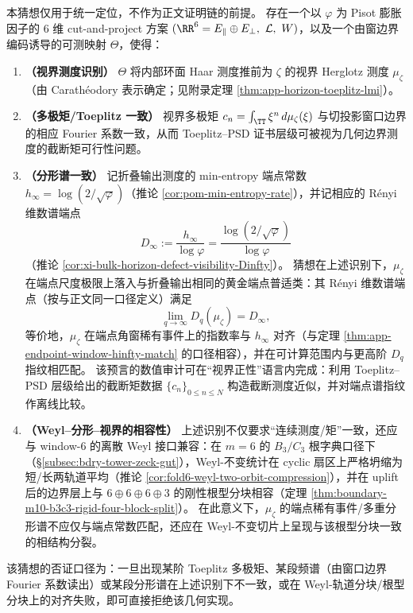\begin{conjecture}\label{conj:discussion-horizon-measure-cutproject}
本猜想仅用于统一定位，不作为正文证明链的前提。
存在一个以 \(\varphi\) 为 Pisot 膨胀因子的 \(6\) 维 cut-and-project 方案 \((\RR^6=E_{\parallel}\oplus E_{\perp},\ \mathcal{L},\ W)\)，以及一个由窗边界编码诱导的可测映射 \(\Theta\)，使得：
\begin{enumerate}
  \item \textbf{（视界测度识别）}
  \(\Theta\) 将内部环面 Haar 测度推前为 \(\zeta\) 的视界 Herglotz 测度 \(\mu_\zeta\)（由 Carath\'eodory 表示确定；见附录定理 \ref{thm:app-horizon-toeplitz-lmi}）。
  \item \textbf{（多极矩/Toeplitz 一致）}
  视界多极矩 \(c_n=\int_{\TT}\xi^n\,d\mu_\zeta(\xi)\) 与切投影窗口边界的相应 Fourier 系数一致，从而 Toeplitz--PSD 证书层级可被视为几何边界测度的截断矩可行性问题。
  \item \textbf{（分形谱一致）}
  记折叠输出测度的 min-entropy 端点常数 \(h_\infty=\log(2/\sqrt\varphi)\)（推论 \ref{cor:pom-min-entropy-rate}），并记相应的 Rényi 维数谱端点
  \[
    D_\infty:=\frac{h_\infty}{\log\varphi}=\frac{\log(2/\sqrt\varphi)}{\log\varphi}
  \]
  （推论 \ref{cor:xi-bulk-horizon-defect-visibility-Dinfty}）。
  猜想在上述识别下，\(\mu_\zeta\) 在端点尺度极限上落入与折叠输出相同的黄金端点普适类：其 Rényi 维数谱端点（按与正文同一口径定义）满足
  \[
    \lim_{q\to\infty}D_q(\mu_\zeta)=D_\infty,
  \]
  等价地，\(\mu_\zeta\) 在端点角窗稀有事件上的指数率与 \(h_\infty\) 对齐（与定理 \ref{thm:app-endpoint-window-hinfty-match} 的口径相容），并在可计算范围内与更高阶 \(D_q\) 指纹相匹配。
  该预言的数值审计可在“视界正性”语言内完成：利用 Toeplitz--PSD 层级给出的截断矩数据 \(\{c_n\}_{0\le n\le N}\) 构造截断测度近似，并对端点谱指纹作离线比较。
  \item \textbf{（Weyl--分形--视界的相容性）}
  上述识别不仅要求“连续测度/矩”一致，还应与 window-6 的离散 Weyl 接口兼容：在 \(m=6\) 的 \(B_3/C_3\) 根字典口径下（\S\ref{subsec:bdry-tower-zeck-gut}），Weyl-不变统计在 cyclic 扇区上严格坍缩为短/长两轨道平均（推论 \ref{cor:fold6-weyl-two-orbit-compression}），并在 uplift 后的边界层上与 \(6\oplus 6\oplus 6\oplus 3\) 的刚性根型分块相容（定理 \ref{thm:boundary-m10-b3c3-rigid-four-block-split}）。
  在此意义下，\(\mu_\zeta\) 的端点稀有事件/多重分形谱不应仅与端点常数匹配，还应在 Weyl-不变切片上呈现与该根型分块一致的相结构分裂。
\end{enumerate}
该猜想的否证口径为：一旦出现某阶 Toeplitz 多极矩、某段频谱（由窗口边界 Fourier 系数读出）或某段分形谱在上述识别下不一致，或在 Weyl-轨道分块/根型分块上的对齐失败，即可直接拒绝该几何实现。
\end{conjecture}

